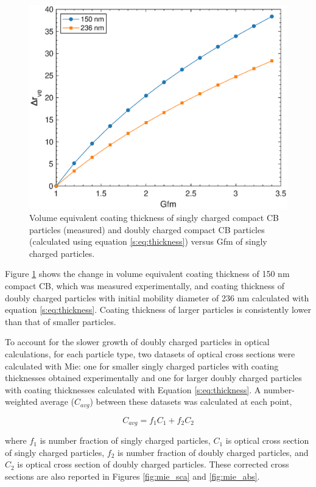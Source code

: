 \documentclass[12pt]{article}
\begin{document}
\begin{figure}[htp]
\centering
\includegraphics[scale=0.7]{images/fig_supp_thickness_formula.eps}
\caption{Volume equivalent coating thickness of singly charged compact CB particles (measured) and doubly charged compact CB particles (calculated using equation \ref{s:eq:thickness}) versus Gfm of singly charged particles.}
\label{s:fig:thickness}
\end{figure}

Figure \ref{s:fig:thickness} shows the change in volume equivalent coating thickness of 150 nm compact CB, which was measured experimentally, and coating thickness of doubly charged particles with initial mobility diameter of 236 nm calculated with equation \ref{s:eq:thickness}. Coating thickness of larger particles is consistently lower than that of smaller particles.

To account for the slower growth of doubly charged particles in optical calculations, for each particle type, two datasets of optical cross sections were calculated with Mie: one for smaller singly charged particles with coating thicknesses obtained experimentally and one for larger doubly charged particles with coating thicknesses calculated with Equation \ref{s:eq:thickness}. A number-weighted average ($C_{avg}$) between these datasets was calculated at each point,

\begin{equation}
    C_{avg}=f_1C_1+f_2C_2
\end{equation}

\noindent where $f_1$ is number fraction of singly charged particles, $C_1$ is optical cross section of singly charged particles, $f_2$ is number fraction of doubly charged particles, and $C_2$ is optical cross section of doubly charged particles. These corrected cross sections are also reported in Figures \ref{fig:mie_sca} and \ref{fig:mie_abs}.
\end{document}
